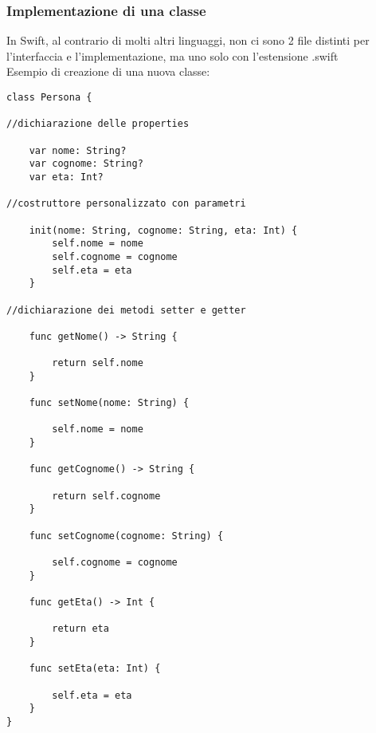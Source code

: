 \subsubsection{Implementazione di una classe}
In Swift, al contrario di molti altri linguaggi, non ci sono 2 file distinti per l'interfaccia e l'implementazione, ma uno solo con l'estensione .swift\\
Esempio di creazione di una nuova classe:\\
\begin{lstlisting}
class Persona { 

//dichiarazione delle properties

	var nome: String? 
	var cognome: String? 
	var eta: Int?

//costruttore personalizzato con parametri 

	init(nome: String, cognome: String, eta: Int) {
		self.nome = nome
		self.cognome = cognome
		self.eta = eta
	}

//dichiarazione dei metodi setter e getter 

	func getNome() -> String {

		return self.nome
	}

	func setNome(nome: String) {

		self.nome = nome
	}

	func getCognome() -> String {

		return self.cognome
	}

	func setCognome(cognome: String) {
	
		self.cognome = cognome
	}

	func getEta() -> Int {
	
		return eta
	}

	func setEta(eta: Int) {

		self.eta = eta
	}
}
\end{lstlisting}
